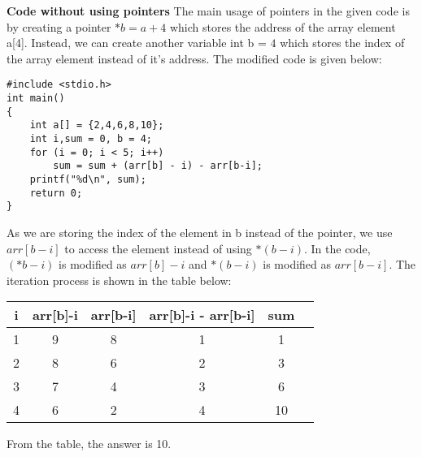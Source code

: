 \documentclass[journal,12pt,twocolumn]{IEEEtran}
\begin{document}
\textbf{Code without using pointers}
The main usage of pointers in the given code is by creating a pointer $*b = a + 4$ which stores the address of the array element a[4]. Instead, we can create another variable int b = $4$ which stores the index of the array element instead of it's address. The modified code is given below:
\begin{lstlisting}
#include <stdio.h>
int main()
{
    int a[] = {2,4,6,8,10};
    int i,sum = 0, b = 4;
    for (i = 0; i < 5; i++)
        sum = sum + (arr[b] - i) - arr[b-i];
    printf("%d\n", sum);
    return 0;
}
\end{lstlisting}
As we are storing the index of the element in b instead of the pointer, we use $arr[b-i]$ to access the element instead of using $*(b-i)$. In the code, $(*b-i)$ is modified as $arr[b]-i$ and $*(b-i)$ is modified as $arr[b-i]$. The iteration process is shown in the table below:
\begin{table}[ht]
        \centering
        \begin{tabular}{|c|c|c|c|c|c|}
        \hline
        i & arr[b]-i & arr[b-i] & arr[b]-i - arr[b-i] & sum \\
        \hline
        1 & 9 & 8 & 1 & 1\\
        \hline
        2 & 8 & 6 & 2 & 3\\
        \hline
        3 & 7 & 4 & 3 & 6\\
        \hline
        4 & 6 & 2 & 4 & 10\\
        \hline        
        \end{tabular}
\end{table}
From the table, the answer is 10.
\end{document}
